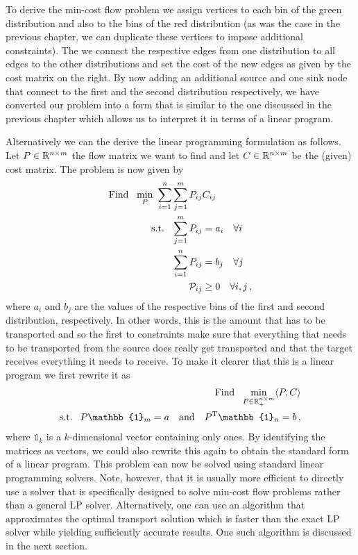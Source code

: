 To derive the min-cost flow problem we assign vertices to each bin of the green
distribution and also to the bins of the red distribution (as was the case in
the previous chapter, we can duplicate these vertices to impose additional
constraints). The we connect the respective edges from one distribution to all
edges to the other distributions and set the cost of the new edges as given by
the cost matrix on the right. By now adding an additional source and one sink
node that connect to the first and the second distribution respectively, we have
converted our problem into a form that is similar to the one discussed in the
previous chapter which allows us to interpret it in terms of a linear program.

Alternatively we can the derive the linear programming formulation as follows.
Let $P \in \R^{n \times m}$ the flow matrix we want to find and let
$C \in \R^{n \times m}$ be the (given) cost matrix. The problem is now given by
\begin{align*}
  \text{Find }\ \min_P \ \sum_{i=1}^n \sum_{j=1}^m P_{ij} &C_{ij} \\
  \text{s.t. }\ \sum_{j=1}^m P_{ij} &= a_i \quad \forall i \\
  \sum_{i=1}^n P_{ij} &= b_j \quad \forall j \\
  \P_{ij} &\ge 0 \quad \forall i,j\,,
\end{align*}
where $a_i$ and $b_j$ are the values of the respective bins of the first and
second distribution, respectively. In other words, this is the amount that has
to be transported and so the first to constraints make sure that everything that
needs to be transported from the source does really get transported and that the
target receives everything it needs to receive. To make it clearer that this is
a linear program we first rewrite it as
\begin{align*}
  \text{Find }\ \min_{P \in \R^{n \times m}_{+}} \langle P,C \rangle \\
  \text{s.t. }\ P \mathbb{1}_m = a \quad \text{and} \quad P^\tp \mathbb{1}_n = b\,,
\end{align*}
where $\mathbb{1}_k$ is a $k$-dimensional vector containing only ones. By
identifying the matrices as vectors, we could also rewrite this again to obtain
the standard form of a linear program. This problem can now be solved using
standard linear programming solvers. Note, however, that it is usually more
efficient to directly use a solver that is specifically designed to solve
min-cost flow problems rather than a general LP solver. Alternatively, one can
use an algorithm that approximates the optimal transport solution which is
faster than the exact LP solver while yielding sufficiently accurate results.
One such algorithm is discussed in the next section.

